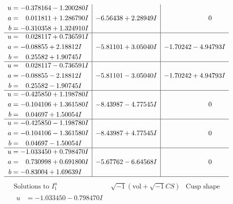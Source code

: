 \documentclass[1p]{elsarticle_modified}
\theoremstyle{definition}
\newcommand{\I}{\sqrt{-1}}
\begin{document}
$$\begin{array}{c|c|c}
\begin{aligned}
u &= -0.378164 - 1.200280 I \\
a &= \phantom{-}0.011811 + 1.286790 I \\
b &= -0.310358 + 1.324910 I\end{aligned}
 & -6.56438 + 2.28949 I & \phantom{-0.000000 } 0 \\ \hline\begin{aligned}
u &= \phantom{-}0.028117 + 0.736591 I \\
a &= -0.08855 + 2.18812 I \\
b &= \phantom{-}0.25582 + 1.90745 I\end{aligned}
 & -5.81101 + 3.05040 I & -1.70242 - 4.94793 I \\ \hline\begin{aligned}
u &= \phantom{-}0.028117 - 0.736591 I \\
a &= -0.08855 - 2.18812 I \\
b &= \phantom{-}0.25582 - 1.90745 I\end{aligned}
 & -5.81101 - 3.05040 I & -1.70242 + 4.94793 I \\ \hline\begin{aligned}
u &= -0.425850 + 1.198780 I \\
a &= -0.104106 + 1.361580 I \\
b &= \phantom{-}0.04697 + 1.50054 I\end{aligned}
 & -8.43987 - 4.77545 I & \phantom{-0.000000 } 0 \\ \hline\begin{aligned}
u &= -0.425850 - 1.198780 I \\
a &= -0.104106 - 1.361580 I \\
b &= \phantom{-}0.04697 - 1.50054 I\end{aligned}
 & -8.43987 + 4.77545 I & \phantom{-0.000000 } 0 \\ \hline\begin{aligned}
u &= -1.033450 + 0.798470 I \\
a &= \phantom{-}0.730998 + 0.691800 I \\
b &= -0.83004 + 1.69639 I\end{aligned}
 & -5.67762 - 6.64568 I & \phantom{-0.000000 } 0\\
 \hline 
 \end{array}$$\newpage$$\begin{array}{c|c|c}  
\text{Solutions to }I^u_{1}& \I (\text{vol} + \sqrt{-1}CS) & \text{Cusp shape}\\
 \hline 
\begin{aligned}
u &= -1.033450 - 0.798470 I \\

\end{aligned}
\end{array}$$
\end{document}
